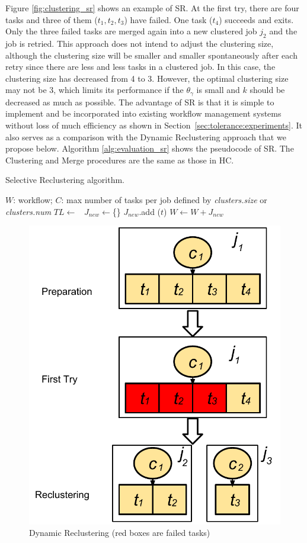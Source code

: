 Figure \ref{fig:clustering_sr} shows an example of SR. At the first try, there are four tasks and three of them ($t_1, t_2, t_3$) have failed. One task ($t_4$) succeeds and exits. Only the three failed tasks are merged again into a new clustered job $j_2$ and the job is retried. This approach does not intend to adjust the clustering size, although the clustering size will be smaller and smaller spontaneously after each retry since there are less and less tasks in a clustered job. In this case, the clustering size has decreased from 4 to 3. However, the optimal clustering size may not be 3, which limits its performance if the $\theta_{\gamma}$ is small and $k$ should be decreased as much as possible. The advantage of SR is that it is simple to implement and be incorporated into existing workflow management systems without loss of much efficiency as shown in Section~\ref{sec:tolerance:experiments}. It also serves as a comparison with the Dynamic Reclustering approach that we propose below. Algorithm \ref{alg:evaluation_sr} shows the pseudocode of SR. The Clustering and Merge procedures are the same as those in HC. 

\begin{algorithm}[!htb]
	\footnotesize
	\caption{Selective Reclustering algorithm. }
	\label{alg:evaluation_sr}
	\begin{algorithmic}[1]
		\Require $W$: workflow; $C$: max number of tasks per job defined by \emph{clusters.size} or \emph{clusters.num}
			\State $TL \gets$\ 
			\State $J_{new}\gets$\{\}
					\State $J_{new}$.add ($t$)
				\EndIf
			\EndFor
			\State $W \gets W + J_{new}$ 
		\EndProcedure
	\end{algorithmic}
\end{algorithm}

 

\begin{figure}[!htb]
\centering
  \includegraphics[width=0.45\linewidth]{figures/tolerance/dr.pdf}
  \caption{Dynamic Reclustering (red boxes are failed tasks)}
  \label{fig:clustering_dr}
\end{figure}


